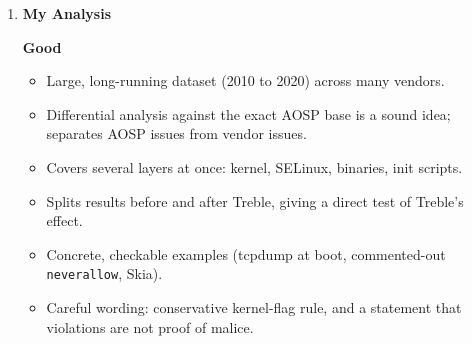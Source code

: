 \documentclass[11pt,a4paper]{article}
\newcommand{\entrypart}[1]{\textbf{\color{accent}#1}\par\vspace{2pt}}
\begin{document}
\begin{enumerate}
    \vspace{4pt}
    \textbf{Limitations (authors)}
    \begin{itemize}[leftmargin=*,itemsep=1pt,topsep=2pt]
        \item Tag identification may have errors; authors say the analysis is not sensitive to small imprecisions.
        \item Kernel config inference from symbols does not support all kernel config options.
        \item 3 kernel configurations have no symbol mapping (Table VI).
        \item Some ROMs lacked a kernel binary or \texttt{boot.img}, or no config or symbols could be extracted; no measurement possible for them.
        \item 351 ROMs with SELinux kernel support but no policy; authors suppose they are incremental updates.
        \item Stack canary measurement assumes that each binary has at least one protectable buffer.
        \item Violations do not imply maliciousness; authors believe most vendors act in good faith.
    \end{itemize}

    \item \entrypart{My Analysis}

    \textbf{Good}
    \begin{itemize}[leftmargin=*,itemsep=1pt,topsep=2pt]
        \item Large, long-running dataset (2010 to 2020) across many vendors.
        \item Differential analysis against the exact AOSP base is a sound idea; separates AOSP issues from vendor issues.
        \item Covers several layers at once: kernel, SELinux, binaries, init scripts.
        \item Splits results before and after Treble, giving a direct test of Treble's effect.
        \item Concrete, checkable examples (tcpdump at boot, commented-out \texttt{neverallow}, Skia).
        \item Careful wording: conservative kernel-flag rule, and a statement that violations are not proof of malice.
    \end{itemize}


\end{enumerate}
\end{document}
